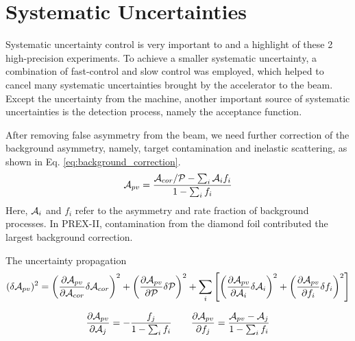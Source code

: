\chapter{Systematic Uncertainties}

Systematic uncertainty control is very important to and a highlight of these 2
high-precision experiments. To achieve a smaller systematic uncertainty, a
combination of fast-control and slow control was employed, which helped 
to cancel many systematic uncertainties brought by the accelerator to the
beam. Except the uncertainty from the machine, another important source
of systematic uncertainties is the detection process, namely the 
acceptance function.

After removing false asymmetry from the beam, we need further correction of the
background asymmetry, namely, target contamination and inelastic scattering,
as shown in Eq. \ref{eq:background_correction}.
\begin{equation}
    \mathcal{A}_{pv} = \frac{\mathcal{A}_{cor}/\mathcal{P} - \sum_i \mathcal{A}_i f_i}{1 - \sum_i f_i}
    \label{eq:background_correction}
\end{equation}
Here, $\mathcal{A}_i$ and $f_i$ refer to the asymmetry and rate fraction of background
processes. In PREX-II, contamination from the diamond foil contributed the
largest background correction.

The uncertainty propagation
\begin{equation}
    (\delta \mathcal{A}_{pv})^2 = 
      \left( \frac{\partial \mathcal{A}_{pv}}{\partial \mathcal{A}_{cor}} \delta \mathcal{A}_{cor} \right)^2
      + \left( \frac{\partial \mathcal{A}_{pv}}{\partial \mathcal{P}} \delta \mathcal{P} \right)^2
      + \sum_i \left[ \left(\frac{\partial \mathcal{A}_{pv}}{\partial \mathcal{A}_i}\delta \mathcal{A}_i \right)^2 
	 + \left(\frac{\partial \mathcal{A}_{pv}}{\partial f_i}\delta f_i \right)^2 \right]
\end{equation}

\begin{equation}
    \frac{\partial \mathcal{A}_{pv}}{\partial \mathcal{A}_j} = -\frac{f_j}{1 - \sum_i f_i}  \qquad
    \frac{\partial \mathcal{A}_{pv}}{\partial f_j} = \frac{\mathcal{A}_{pv} - \mathcal{A}_j}{1 - \sum_i f_i}
    \label{eq:systematic_uncertainty}
\end{equation}

